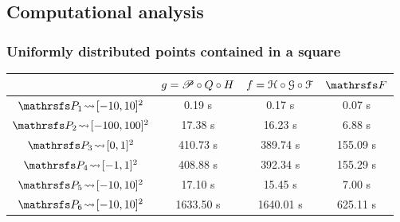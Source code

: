 \documentclass{beamer}
\begin{document}
\subsection{Computational analysis}
\begin{frame}
\frametitle{Uniformly distributed points contained in a square}
\begin{table}[ht!]
\begin{center}
\begin{tabular}{c || c | c | c}
& $g = \P\circ Q\circ H$ & $f=\HH\circ\GG\circ\FF$ & $\FFF$ \\ \hline \hline
$\PP_1\! \leadsto\! [-10, 10]^2$ & 0.19 s & 0.17 s & 0.07 s \\ \hline
$\PP_2\! \leadsto\! [-100, 100]^2$ & 17.38 s & 16.23 s & 6.88 s \\ \hline
$\PP_3\! \leadsto\! [0, 1]^2$ & 410.73 s & 389.74 s & 155.09 s \\ \hline
$\PP_4\! \leadsto\! [-1, 1]^2$ & 408.88 s & 392.34 s & 155.29 s \\ \hline
$\PP_5\! \leadsto\! [-10, 10]^2$ & 17.10 s & 15.45 s & 7.00 s \\ \hline
$\PP_6\! \leadsto\! [-10, 10]^2$ & 1633.50 s & 1640.01 s & 625.11 s \\
\end{tabular}
\end{center}
\end{table}


\end{frame}
\end{document}
